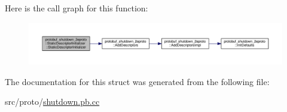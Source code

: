 Here is the call graph for this function\+:
\nopagebreak
\begin{figure}[H]
\begin{center}
\leavevmode
\includegraphics[width=350pt]{structprotobuf__shutdown__2eproto_1_1_static_descriptor_initializer_af6c3d8444ace838e18f73c35dc4bc7c6_cgraph}
\end{center}
\end{figure}




The documentation for this struct was generated from the following file\+:\begin{DoxyCompactItemize}
\item 
src/proto/\hyperlink{shutdown_8pb_8cc}{shutdown.\+pb.\+cc}\end{DoxyCompactItemize}
